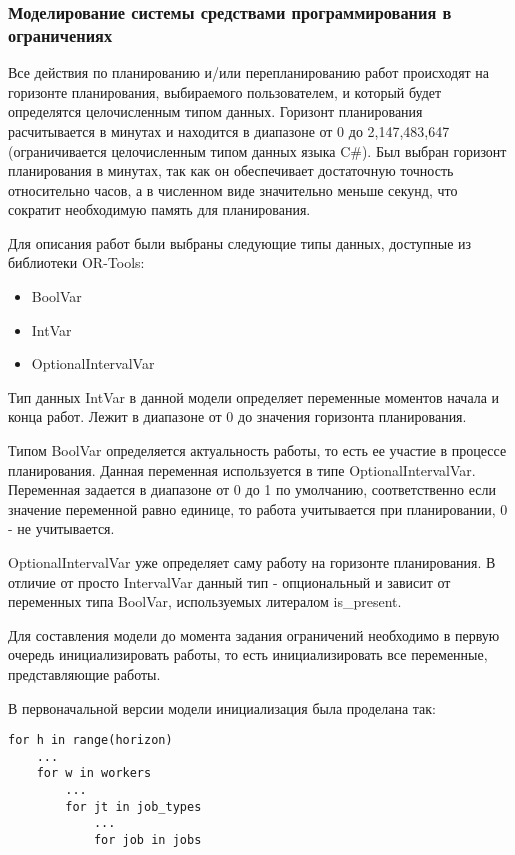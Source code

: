 \subsubsection{Моделирование системы средствами программирования в ограничениях}

Все действия по планированию и/или перепланированию работ происходят на горизонте планирования, выбираемого пользователем, и который будет определятся целочисленным типом данных. Горизонт планирования расчитывается в минутах и находится в диапазоне от 0 до 2,147,483,647 (ограничивается целочисленным типом данных языка C\#). Был выбран горизонт планирования в минутах, так как он обеспечивает достаточную точность относительно часов, а в численном виде значительно меньше секунд, что сократит необходимую память для планирования.

Для описания работ были выбраны следующие типы данных, доступные из библиотеки OR-Tools:
\begin{itemize}
	\item BoolVar
	\item IntVar
	\item OptionalIntervalVar
\end{itemize}

Тип данных IntVar в данной модели определяет переменные моментов начала и конца работ. Лежит в диапазоне от 0 до значения горизонта планирования.

Типом BoolVar определяется актуальность работы, то есть ее участие в процессе планирования. Данная переменная используется в типе OptionalIntervalVar. Переменная задается в диапазоне от 0 до 1 по умолчанию, соответственно если значение переменной равно единице, то работа учитывается при планировании, 0 - не учитывается.

OptionalIntervalVar уже определяет саму работу на горизонте планирования. В отличие от просто IntervalVar данный тип - опциональный и зависит от переменных типа BoolVar, используемых литералом is\_present.

Для составления модели до момента задания ограничений необходимо в первую очередь инициализировать работы, то есть инициализировать все переменные, представляющие работы.

В первоначальной версии модели инициализация была проделана так:
\begin{verbatim}
for h in range(horizon)
    ...
    for w in workers
        ...
        for jt in job_types
            ...
            for job in jobs
\end{verbatim}

